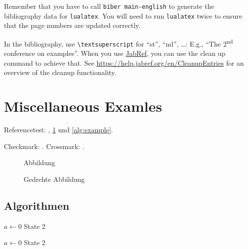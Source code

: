 \documentclass[
  numbers=noenddot,
  english,  %
  a4paper,  %
  twoside,  %
  bibliography=totoc,
  headsepline,
  cleardoublepage=empty,
  parskip=half,
  draft=false
]{scrbook}
\theoremstyle{break}
\newcommand{\dingcheck}{\ding{51}}
\newcommand{\dingcross}{\ding{55}}
\begin{document}
Remember that you have to call \texttt{biber main-english} to generate the bibliography data for \texttt{lualatex}.
You will need to run \texttt{lualatex} twice to ensure that the page numbers are updated correctly.


In the bibliography, use \texttt{\textbackslash textsuperscript} for \enquote{st}, \enquote{nd}, \ldots:
E.g., \enquote{The 2\textsuperscript{nd} conference on examples}.
When you use \href{https://www.jabref.org}{JabRef}, you can use the clean up command to achieve that.
See \url{https://help.jabref.org/en/CleanupEntries} for an overview of the cleanup functionality.

\section{Miscellaneous Examles}
\label{ssec:example}

Referencetest: , \cref{fig:Abbildung} und \cref{alg:example}.

\begin{ltgexample}
Checkmark: \dingcheck.
Crossmark: \dingcross.
\end{ltgexample}

\begin{figure}
  \missingfigure{}
  \caption{Abbildung}
  \label{fig:Abbildung}
\end{figure}

\begin{landscape}
  \begin{figure}
    \missingfigure{}
    \caption{Gedrehte Abbildung}
    \label{fig:AbbildungGedreht}
  \end{figure}
\end{landscape}

\subsection{Algorithmen}

\begin{algorithm}
  \caption{$algo$}
  \label{alg:example}
  \begin{algorithmic}[1]
    \State $a \gets 0$
    \State State 2\label{alg1:state2}
  \end{algorithmic}
\end{algorithm}

\begin{algorithm}
  \caption{Algorithmus 2}
  \label{alg:example2}
  \begin{algorithmic}[1]
    \State $a \gets 0$
    \State State 2\label{alg2:state2}
  \end{algorithmic}
\end{algorithm}
\end{document}
